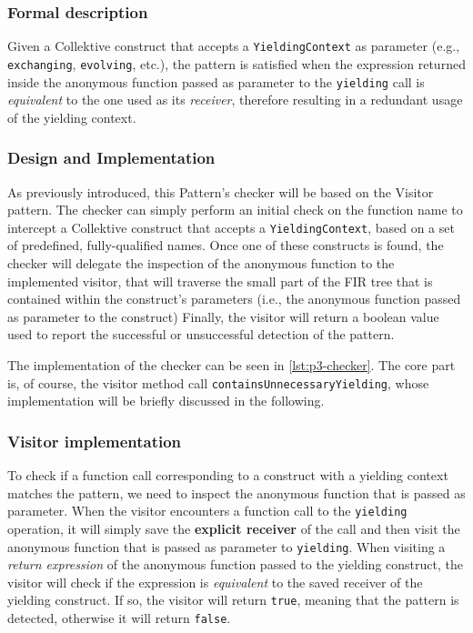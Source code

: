 \documentclass[12pt,a4paper,openright,twoside]{book}
\begin{document}
\subsubsection{Formal description}

Given a Collektive construct that accepts a \lstinline{YieldingContext} as
parameter (e.g., \lstinline{exchanging}, \lstinline{evolving}, etc.), the
pattern is satisfied when the expression returned inside the anonymous function
passed as parameter to the \lstinline{yielding} call is \emph{equivalent} to the
one used as its \emph{receiver}, therefore resulting in a redundant usage of the
yielding context. 

\subsubsection{Design and Implementation}

As previously introduced, this Pattern's checker will be based on the Visitor
pattern. The checker can simply perform an initial check on the function name to
intercept a Collektive construct that accepts a \lstinline{YieldingContext},
based on a set of predefined, fully-qualified names. 
%
Once one of these constructs is found, the checker will delegate the inspection
of the anonymous function to the implemented visitor, that will traverse the
small part of the \ac{FIR} tree that is contained within the construct's
parameters (i.e., the anonymous function passed as parameter to the construct)
%
Finally, the visitor will return a boolean value used to report the successful
or unsuccessful detection of the pattern.

The implementation of the checker can be seen in \cref{lst:p3-checker}. The core
part is, of course, the visitor method call
\lstinline{containsUnnecessaryYielding}, whose implementation will be briefly
discussed in the following.



\subsubsection{Visitor implementation}

To check if a function call corresponding to a construct with a yielding context
matches the pattern, we need to inspect the anonymous function that is passed as
parameter. When the visitor encounters a function call to the
\lstinline{yielding} operation, it will simply save the \textbf{explicit
receiver} of the call and then visit the anonymous function that is passed as
parameter to \lstinline{yielding}.
%
When visiting a \emph{return expression} of the anonymous function
passed to the yielding construct, the visitor will check if the expression is
\emph{equivalent} to the saved receiver of the yielding construct.
%
If so, the visitor will return \lstinline{true}, meaning that the pattern is
detected, otherwise it will return \lstinline{false}. 
\end{document}
